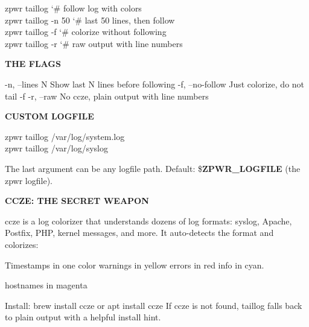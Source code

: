 \documentclass[11pt,a4paper,twoside]{book}
\begin{document}
\begin{codebox}
\color{neongreen}zpwr taillog                        {\char`\#} follow log with colors\\
\color{neongreen}zpwr taillog -n 50                  {\char`\#} last 50 lines, then follow\\
\color{neongreen}zpwr taillog -f                     {\char`\#} colorize without following\\
\color{neongreen}zpwr taillog -r                     {\char`\#} raw output with line numbers\\
\end{codebox}


\vspace{12pt}
{\bfseries\color{neonyellow} THE FLAGS}\vspace{4pt}

-n, --lines N     Show last N lines before following -f, --no-follow   Just colorize, do not tail -f -r, --raw         No ccze, plain output with line numbers


\vspace{12pt}
{\bfseries\color{neonyellow} CUSTOM LOGFILE}\vspace{4pt}

\begin{codebox}
\color{neongreen}zpwr taillog /var/log/system.log\\
\color{neongreen}zpwr taillog /var/log/syslog\\
\end{codebox}

The last argument can be any logfile path. Default: \$\textbf{ZPWR\_LOGFILE} (the zpwr logfile).


\vspace{12pt}
{\bfseries\color{neonyellow} CCZE: THE SECRET WEAPON}\vspace{4pt}

ccze is a log colorizer that understands dozens of log formats: syslog, Apache, Postfix, PHP, kernel messages, and more. It auto-detects the format and colorizes:

Timestamps     in one color warnings       in yellow errors         in red info           in cyan.

\begin{codebox}
\color{neongreen}hostnames      in magenta\\
\end{codebox}

Install: brew install ccze  or  apt install ccze If ccze is not found, taillog falls back to plain output with a helpful install hint.
\end{document}
